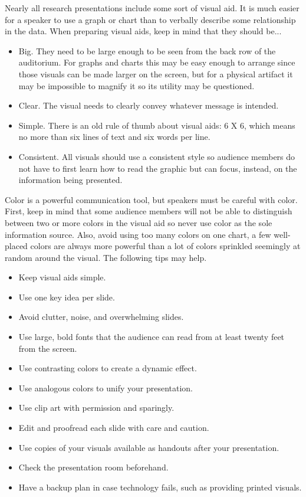 Nearly all research presentations include some sort of visual aid. It is much easier for a speaker to use a graph or chart than to verbally describe some relationship in the data. When preparing visual aids, keep in mind that they should be...

\begin{itemize}
	\item Big. They need to be large enough to be seen from the back row of the auditorium. For graphs and charts this may be easy enough to arrange since those visuals can be made larger on the screen, but for a physical artifact it may be impossible to magnify it so its utility may be questioned.
	\item Clear. The visual needs to clearly convey whatever message is intended.
	\item Simple. There is an old rule of thumb about visual aids: 6 X 6, which means no more than six lines of text and six words per line.
	\item Consistent. All visuals should use a consistent style so audience members do not have to first learn how to read the graphic but can focus, instead, on the information being presented.
\end{itemize}

Color is a powerful communication tool, but speakers must be careful with color. First, keep in mind that some audience members will not be able to distinguish between two or more colors in the visual aid so never use color as the sole information source. Also, avoid using too many colors on one chart, a few well-placed colors are always more powerful than a lot of colors sprinkled seemingly at random around the visual. The following tips may help.

\begin{itemize}
	\item Keep visual aids simple.
	\item Use one key idea per slide.
	\item Avoid clutter, noise, and overwhelming slides.
	\item Use large, bold fonts that the audience can read from at least twenty feet from the screen.
	\item Use contrasting colors to create a dynamic effect.
	\item Use analogous colors to unify your presentation.
	\item Use clip art with permission and sparingly.
	\item Edit and proofread each slide with care and caution.
	\item Use copies of your visuals available as handouts after your presentation.
	\item Check the presentation room beforehand.
	\item Have a backup plan in case technology fails, such as providing printed visuals.
\end{itemize}

